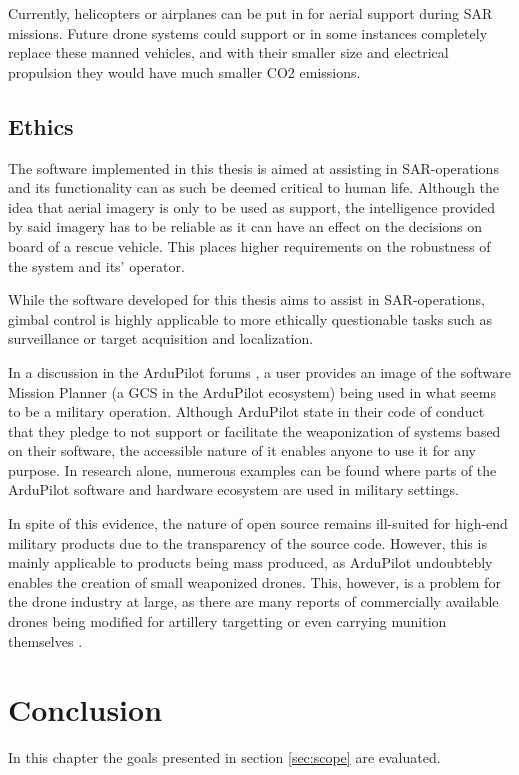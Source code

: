 \documentclass[nofilelist]{cslthse-msc}
\begin{document}
Currently, helicopters or airplanes can be put in for aerial support during SAR missions. Future drone systems could support or in some instances completely replace these manned vehicles, and with their smaller size and electrical propulsion they would have much smaller CO2 emissions.

\section{Ethics}
The software implemented in this thesis is aimed at assisting in SAR-operations and its functionality can as such be deemed critical to human life. Although the idea that aerial imagery is only to be used as support, the intelligence provided by said imagery has to be reliable as it can have an effect on the decisions on board of a rescue vehicle. This places higher requirements on the robustness of the system and its' operator. 

While the software developed for this thesis aims to assist in SAR-operations, gimbal control is highly applicable to more ethically questionable tasks such as surveillance or target acquisition and localization. 

In a discussion in the ArduPilot forums \cite{ardupilot-military-discussion}, a user provides an image of the software Mission Planner (a GCS in the ArduPilot ecosystem) being used in what seems to be a military operation. Although ArduPilot state in their code of conduct \cite{ardupilot-coc} that they pledge to not support or facilitate the weaponization of systems based on their software, the accessible nature of it enables anyone to use it for any purpose. In research alone, numerous examples can be found \cite{ardupilot-military} \cite{ardupilot-military-1} where parts of the ArduPilot software and hardware ecosystem are used in military settings.

In spite of this evidence, the nature of open source remains ill-suited for high-end military products due to the transparency of the source code. However, this is mainly applicable to products being mass produced, as ArduPilot undoubtebly enables the creation of small weaponized drones. This, however, is a problem for the drone industry at large, as there are many reports of commercially available drones being modified for artillery targetting or even carrying munition themselves \cite{drones-ukraine}. 

\chapter{Conclusion}
In this chapter the goals presented in section \ref{sec:scope} are evaluated.
\end{document}
